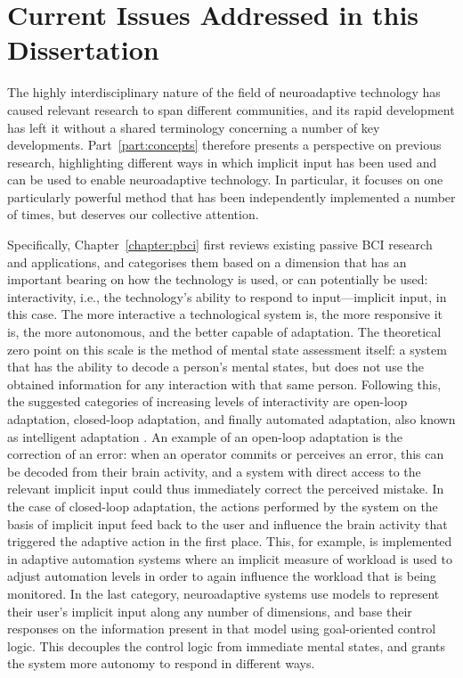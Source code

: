 %
\section*{Current Issues Addressed in this Dissertation}%

The highly interdisciplinary nature of the field of neuroadaptive technology has caused relevant research to span different communities, and its rapid development has left it without a shared terminology concerning a number of key developments. Part~\ref{part:concepts} therefore presents a perspective on previous research, highlighting different ways in which implicit input has been used and can be used to enable neuroadaptive technology. In particular, it focuses on one particularly powerful method that has been independently implemented a number of times, but deserves our collective attention.

Specifically, Chapter~\ref{chapter:pbci} first reviews existing passive BCI research and applications, and categorises them based on a dimension that has an important bearing on how the technology is used, or can potentially be used: interactivity, i.e., the technology's ability to respond to input---implicit input, in this case. The more interactive a technological system is, the more responsive it is, the more autonomous, and the better capable of adaptation. The theoretical zero point on this scale is the method of mental state assessment itself: a system that has the ability to decode a person's mental states, but does not use the obtained information for any interaction with that same person. Following this, the suggested categories of increasing levels of interactivity are open-loop adaptation, closed-loop adaptation, and finally automated adaptation, also known as intelligent adaptation \cite{fairclough2017intadapt}. An example of an open-loop adaptation is the correction of an error: when an operator commits or perceives an error, this can be decoded from their brain activity, and a system with direct access to the relevant implicit input could thus immediately correct the perceived mistake. In the case of closed-loop adaptation, the actions performed by the system on the basis of implicit input feed back to the user and influence the brain activity that triggered the adaptive action in the first place. This, for example, is implemented in adaptive automation systems where an implicit measure of workload is used to adjust automation levels in order to again influence the workload that is being monitored. In the last category, neuroadaptive systems use models to represent their user's implicit input along any number of dimensions, and base their responses on the information present in that model using goal-oriented control logic. This decouples the control logic from immediate mental states, and grants the system more autonomy to respond in different ways.

